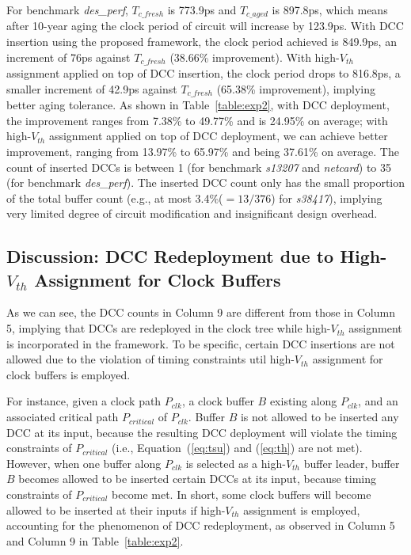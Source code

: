 For benchmark \textit{des\_perf}, $T_{c\_fresh}$ is 773.9ps and $T_{c\_aged}$ is 897.8ps, which means after 10-year aging the clock period of circuit will increase by 123.9ps. With DCC insertion using the proposed framework, the clock period achieved is 849.9ps, an increment of 76ps against $T_{c\_fresh}$ (38.66\% improvement). With high-$V_{th}$ assignment applied on top of DCC insertion, the clock period drops to 816.8ps, a smaller increment of 42.9ps against $T_{c\_fresh}$ (65.38\% improvement), implying better aging tolerance. As shown in Table~\ref{table:exp2}, with DCC deployment, the improvement ranges from 7.38\% to 49.77\% and is 24.95\% on average; with high-$V_{th}$ assignment applied on top of DCC deployment, we can achieve better improvement, ranging from 13.97\% to 65.97\% and being 37.61\% on average. The count of inserted DCCs is between 1 (for benchmark \textit{s13207} and \textit{netcard}) to 35 (for benchmark \textit{des\_perf}). The inserted DCC count only has the small proportion of the total buffer count (e.g., at most 3.4\%($= 13/376$) for \textit{s38417}), implying very limited degree of circuit modification and insignificant design overhead. %

\subsection{Discussion: DCC Redeployment due to High-$V_{th}$ Assignment for Clock Buffers}
As we can see, the DCC counts in Column 9 are different from those in Column 5, implying that DCCs are redeployed in the clock tree while high-$V_{th}$ assignment is incorporated in the framework. 
To be specific, certain DCC insertions are not allowed due to the violation of timing constraints util high-$V_{th}$ assignment for clock buffers is employed.

For instance, given a clock path $P_{clk}$, a clock buffer $B$ existing along $P_{clk}$, and an associated critical path $P_{critical}$ of $P_{clk}$. Buffer $B$ is not allowed to be inserted any DCC at its input, because the resulting DCC deployment will violate the timing constraints of $P_{critical}$ (i.e., Equation~(\ref{eq:tsu}) and (\ref{eq:th}) are not met). However, when one buffer along $P_{clk}$ is selected as a high-$V_{th}$ buffer leader, buffer $B$ becomes allowed to be inserted certain DCCs at its input, because timing constraints of $P_{critical}$ become met. In short, some clock buffers will become allowed to be inserted at their inputs if high-$V_{th}$ assignment is employed, accounting for the phenomenon of DCC redeployment, as observed in Column 5 and Column 9 in Table~\ref{table:exp2}.

